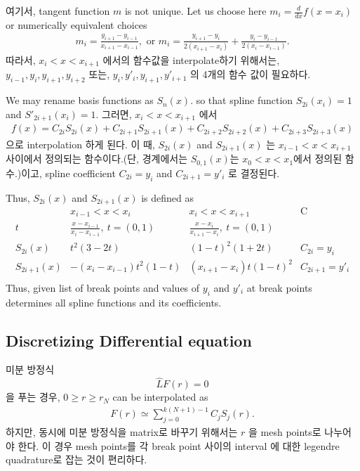 \documentclass[10pt]{article}
\newcommand{\bea}{\begin{eqnarray}}
\newcommand{\eea}{\end{eqnarray}}
\begin{document}
여기서, tangent function $m$ is not unique.
Let us choose here $m_i=\frac{d}{dx}f({x=x_i})$
or numerically equivalent choices
\bea
m_i=\frac{y_{i+1}-y_{i-1}}{x_{i+1}-x_{i-1}},\mbox{ or }
m_i=\frac{y_{i+1}-y_i}{2(x_{i+1}-x_i)}
   +\frac{y_{i}-y_{i-1}}{2(x_{i}-x_{i-1})}.
\eea
따라서, $x_i<x<x_{i+1}$ 에서의 함수값을 interpolate하기 위해서는,
$y_{i-1},y_{i},y_{i+1},y_{i+2}$ 또는,
$y_{i},y'_i,y_{i+1},y'_{i+1}$ 의 4개의 함수 값이 필요하다. 

 We may rename basis functions as $S_{n}(x)$.
so that spline function $S_{2i}(x_i)=1$ and 
$S'_{2i+1}(x_i)=1$.
그러면, $x_i<x<x_{i+1}$ 에서
\bea
f(x)=C_{2i} S_{2i}(x)+C_{2i+1}S_{2i+1}(x)+C_{2i+2}S_{2i+2}(x)
    +C_{2i+3}S_{2i+3}(x)
\eea
으로 interpolation 하게 된다. 이 때, $S_{2i}(x)$ and $S_{2i+1}(x)$
는 $x_{i-1}<x<x_{i+1}$ 사이에서 정의되는 함수이다.(단, 경계에서는
$S_{0,1}(x)$는 $x_0<x<x_1$에서 정의된 함수.)이고, spline coefficient
$C_{2i}=y_i$ and $C_{2i+1}=y'_i$ 로 결정된다.

Thus, $S_{2i}(x)$ and $S_{2i+1}(x)$ is defined as
\begin{equation}
\begin{array}{c|c|c|c}
      &  x_{i-1}<x<x_i & x_i<x<x_{i+1} & \mbox{C}\\ \hline
  t   & \frac{x-x_{i-1}}{x_i-x_{i-1}},\ t=(0,1) 
      & \frac{x-x_i}{x_{i+1}-x_i},\ t=(0,1) 
      & \\
  S_{2i}(x) & t^2(3-2t)    & (1-t)^2(1+2t) & C_{2i}=y_i\\
  S_{2i+1}(x) & -(x_i-x_{i-1})t^2(1-t) & (x_{i+1}-x_i)t(1-t)^2 
              & C_{2i+1}=y'_i\\
\end{array}
\end{equation}
Thus, given list of break points and values of $y_i$ and $y'_i$
at break points determines all spline functions and 
its coefficients.


\subsection{Discretizing Differential equation}
미분 방정식
$$\hat{L} F(r)=0 $$ 을 푸는 경우, $0\ge r\ge r_N$ can be interpolated as
\bea
F(r)\simeq \sum_{j=0}^{k(N+1)-1} C_j S_j(r).
\eea
하지만, 동시에 미분 방정식을
matrix로 바꾸기 위해서는 $r$ 을 mesh points로 나누어야 한다.
이 경우 mesh points를 각 break point 사이의 interval 에 대한
legendre quadrature로 잡는 것이 편리하다.
\end{document}
